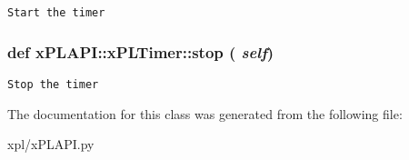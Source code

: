 \footnotesize\begin{verbatim}
Start the timer
\end{verbatim}
\normalsize
 \hypertarget{classxPLAPI_1_1xPLTimer_2a04504c8d29908bc6601879fe63aa23}{
\subsubsection[stop]{\setlength{\rightskip}{0pt plus 5cm}def xPLAPI::xPLTimer::stop ( {\em self})}}
\label{classxPLAPI_1_1xPLTimer_2a04504c8d29908bc6601879fe63aa23}




\footnotesize\begin{verbatim}
Stop the timer
\end{verbatim}
\normalsize
 

The documentation for this class was generated from the following file:\begin{CompactItemize}
\item 
xpl/xPLAPI.py\end{CompactItemize}
